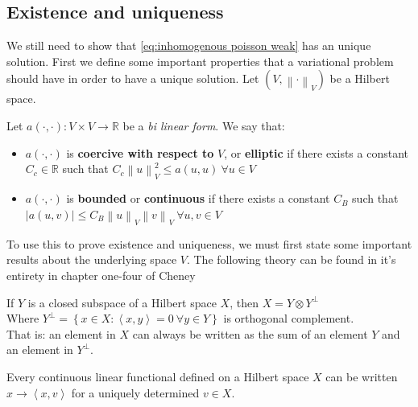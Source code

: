 \documentclass[../Main/main.tex]{subfiles}
\begin{document}
	\subsection*{Existence and uniqueness}
	We still need to show that \eqref{eq:inhomogenous poisson weak} has an unique solution.
	First we define some important properties that a variational problem should have in order to have a unique solution. Let $(V,\left \| \cdot \right \|_V)$ be a Hilbert space.
	\begin{definition} Let $a(\cdot,\cdot):V\times V \rightarrow \mathbb{R}$ be a \emph{bi linear form}. We say that:
			\begin{itemize}
			\item $a(\cdot,\cdot)$ is \textbf{coercive with respect to }$V$, or \textbf{elliptic} if there exists a constant $C_c\in \mathbb{R}$ such that $C_c\left \| u \right \|_V^2 \leq a(u,u) \ \forall u \in V$
			\item $a(\cdot,\cdot)$ is \textbf{bounded} or \textbf{continuous} if there exists a constant $C_B$ such that $|a(u,v)|\leq C_B\left \| u \right \|_V\left \| v \right \|_V \ \forall u,v \in V$
			\end{itemize}
	\end{definition}
	To use this to prove existence and uniqueness, we must first state some important results about the underlying space $V$. The following theory can be found in it's entirety in chapter one-four of Cheney \cite{Cheney}
	\begin{theorem}\label{th:decomposition of hilbert}
		If $Y$ is a closed subspace of a Hilbert space $X$, then $X = Y\otimes Y^{\bot}$ \\
		Where $Y^{\bot} = \left \{ \left. x\in X: \left \langle x,y \right \rangle=0 \ \forall y \in Y \right \} \right.$ is orthogonal complement.\\ That is: an element in $X$ can always be written as the sum of an element $Y$ and an element in $Y^{\bot}$.
	\end{theorem}
	\begin{theorem}\label{th:riesz representation}
		Every continuous linear functional defined on a Hilbert space $X$ can be written $x\rightarrow \left \langle x,v \right \rangle$ for a uniquely determined $v \in X$.
	\end{theorem}
\end{document}
